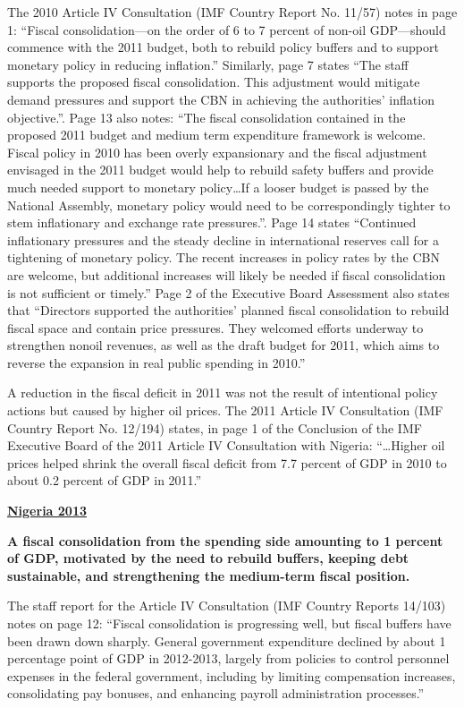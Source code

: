 The 2010 Article IV Consultation (IMF Country Report No. 11/57) notes in page 1: “Fiscal consolidation—on the order of 6 to 7 percent of non-oil GDP—should commence with the 2011 budget, both to rebuild policy buffers and to support monetary policy in reducing inflation.” Similarly, page 7 states “The staff supports the proposed fiscal consolidation. This adjustment would mitigate demand pressures and support the CBN in achieving the authorities’ inflation objective.”. Page 13 also notes: “The fiscal consolidation contained in the proposed 2011 budget and medium term expenditure framework is welcome. Fiscal policy in 2010 has been overly expansionary and the fiscal adjustment envisaged in the 2011 budget would help to rebuild safety buffers and provide much needed support to monetary policy…If a looser budget is passed by the National Assembly, monetary policy would need to be correspondingly tighter to stem inflationary and exchange rate pressures.”. Page 14 states “Continued inflationary pressures and the steady decline in international reserves call for a tightening of monetary policy. The recent increases in policy rates by the CBN are welcome, but additional increases will likely be needed if fiscal consolidation is not sufficient or timely.” Page 2 of the Executive Board Assessment also states that “Directors supported the authorities’ planned fiscal consolidation to rebuild fiscal space and contain price pressures. They welcomed efforts underway to strengthen nonoil revenues, as well as the draft budget for 2011, which aims to reverse the expansion in real public spending in 2010.”

A reduction in the fiscal deficit in 2011 was not the result of intentional policy actions but caused by higher oil prices. The 2011 Article IV Consultation (IMF Country Report No. 12/194) states, in page 1 of the Conclusion of the IMF Executive Board of the 2011 Article IV Consultation with Nigeria: “…Higher oil prices helped shrink the overall fiscal deficit from 7.7 percent of GDP in 2010 to about 0.2 percent of GDP in 2011.”

\textbf{\underline{Nigeria 2013}}

\textbf{A fiscal consolidation from the spending side amounting to 1 percent of GDP, motivated by the need to rebuild buffers, keeping debt sustainable, and strengthening the medium-term fiscal position.}

The staff report for the Article IV Consultation (IMF Country Reports 14/103) notes on page 12: “Fiscal consolidation is progressing well, but fiscal buffers have been drawn down sharply. General government expenditure declined by about 1 percentage point of GDP in 2012-2013, largely from policies to control personnel expenses in the federal government, including by limiting compensation increases, consolidating pay bonuses, and enhancing payroll administration processes.”

